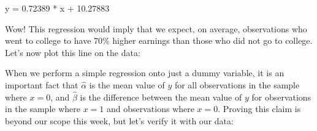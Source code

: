\documentclass[letterpaper,10pt,english]{jupyterBook}
\begin{document}
\begin{sphinxVerbatim}[commandchars=\\\{\}]
  
  

   
      
      

 
\end{sphinxVerbatim}

\begin{sphinxVerbatim}[commandchars=\\\{\}]
y = 0.72389 * x + 10.27883
\end{sphinxVerbatim}

\sphinxAtStartPar
Wow! This regression would imply that we expect, on average, observations who went to college to have 70\% higher earnings than those who did not go to college. Let’s now plot this line on the data:

\noindent{}

\noindent{}

\sphinxAtStartPar
When we perform a simple regression onto just a dummy variable, it is an important fact that \(\hat{\alpha}\) is the mean value of \(y\) for all observations in the sample where \(x = 0\), and \(\hat{\beta}\) is the difference between the mean value of \(y\) for observations in the sample where \(x = 1\) and observations where \(x = 0\). Proving this claim is beyond our scope this week, but let’s verify it with our data:
\end{document}
